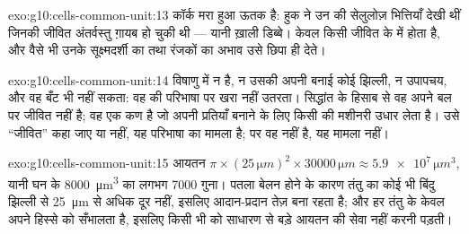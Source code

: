 \begin{solution}{exo:g10:cells-common-unit:13}
कॉर्क मरा हुआ ऊतक है: हुक ने उन  की सेलुलोज़ भित्तियाँ देखी थीं
जिनकी जीवित अंतर्वस्तु ग़ायब हो चुकी थी --- यानी ख़ाली डिब्बे। 
केवल किसी जीवित  के  में होता है, और वैसे भी उनके
सूक्ष्मदर्शी का  तथा रंजकों का अभाव उसे छिपा ही देते।
\end{solution}

\begin{solution}{exo:g10:cells-common-unit:14}
विषाणु में न  है, न उसकी अपनी बनाई कोई झिल्ली, न उपापचय, और
वह बँट भी नहीं सकता: वह  की परिभाषा पर खरा नहीं उतरता। 
सिद्धांत के हिसाब से वह अपने बल पर जीवित नहीं है; वह एक कण है जो अपनी
प्रतियाँ बनाने के लिए किसी  की मशीनरी उधार लेता है। उसे ``जीवित''
कहा जाए या नहीं, यह परिभाषा का मामला है; पर वह  नहीं है, यह मामला
नहीं।
\end{solution}

\begin{solution}{exo:g10:cells-common-unit:15}
आयतन $\pi \times (25\,\unit{\micro m})^2 \times 30000\,\unit{\micro m}
\approx \num{5.9e7}\,\unit{\micro m^3}$, यानी घन के
\qty{8000}{\micro m^3} का लगभग 7000 गुना। पतला बेलन होने के कारण तंतु का
कोई भी बिंदु झिल्ली से \qty{25}{\micro m} से अधिक दूर नहीं, इसलिए
आदान-प्रदान तेज़ बना रहता है; और हर  तंतु के केवल अपने हिस्से को
सँभालता है, इसलिए किसी भी  को साधारण  से बड़े आयतन की सेवा
नहीं करनी पड़ती।
\end{solution}


